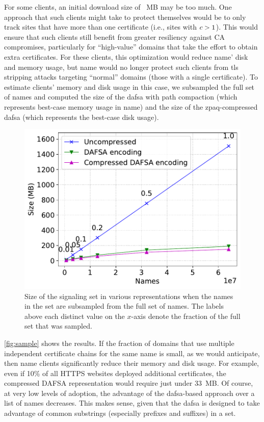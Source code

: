 For some clients, an initial download size of \fsapczpaqmedsize{}~MB may be too much. One
approach that such clients might take to protect themselves would be to only track
sites that have more than one certificate (i.e., sites with $c > 1$).
This would ensure that such clients still benefit from greater resiliency
against CA compromises, particularly for ``high-value'' domains that take the effort
to obtain extra certificates. 
For these clients, this optimization would reduce \ac{name}' disk and memory usage,
but \ac{name} would no longer protect such clients 
from \ac{tls} stripping attacks targeting
``normal'' domains (those with a single certificate).
To estimate clients' memory and disk usage in this case, we subsampled the full set of names
and computed the size of the \ac{dafsa} with path compaction (which represents
best-case memory usage in \ac{name}) and the size of the zpaq-compressed
\ac{dafsa} (which represents the best-case disk usage).

\begin{figure}[t]
  \centering
  \includegraphics[width=\linewidth]{fig/sample}
  \caption{Size of the signaling set in various representations when 
           the names in the set are subsampled from the full set of names. 
           The labels above each distinct value on the $x$-axis
           denote the fraction of the full set that was sampled.}
  \label{fig:sample}
\end{figure}

\autoref{fig:sample} shows the results. If the fraction of
domains that use multiple independent certificate chains for the same name is
small, as we would anticipate, then \ac{name} clients 
significantly reduce their memory and disk usage. 
For example, even if 10\% of all HTTPS websites deployed additional certificates,
the compressed DAFSA representation would require just under 33~MB.
Of course, at very low levels of adoption,
the advantage of the \ac{dafsa}-based
approach over a list of names decreases. This makes sense, given that the
\ac{dafsa} is designed to take advantage of common substrings (especially
prefixes and suffixes) in a set.

